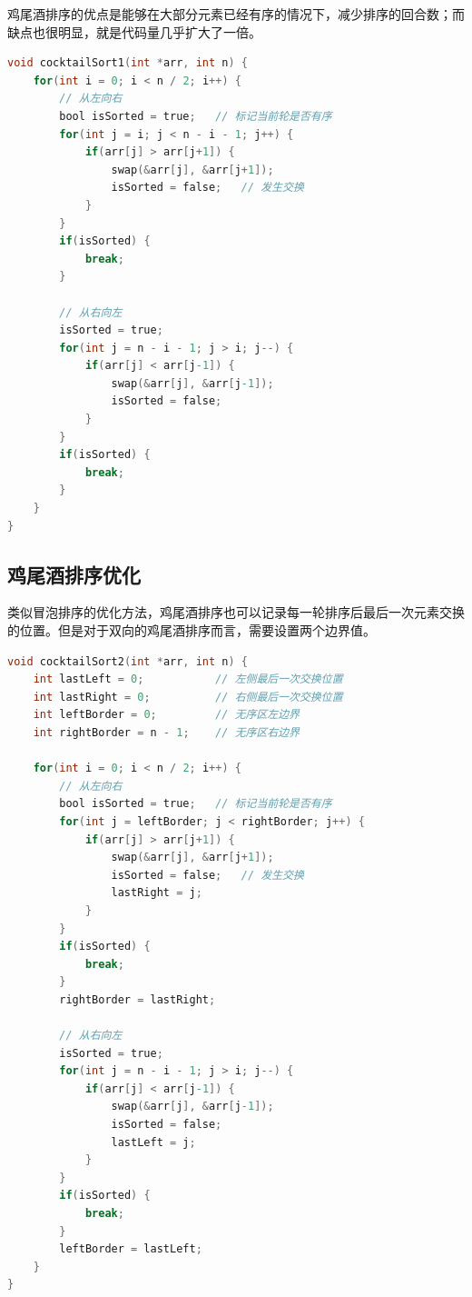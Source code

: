 鸡尾酒排序的优点是能够在大部分元素已经有序的情况下，减少排序的回合数；而缺点也很明显，就是代码量几乎扩大了一倍。 \\


\begin{lstlisting}[language=C]
void cocktailSort1(int *arr, int n) {
    for(int i = 0; i < n / 2; i++) {
        // 从左向右
        bool isSorted = true;   // 标记当前轮是否有序
        for(int j = i; j < n - i - 1; j++) {
            if(arr[j] > arr[j+1]) {
                swap(&arr[j], &arr[j+1]);
                isSorted = false;   // 发生交换
            }
        }
        if(isSorted) {
            break;
        }

        // 从右向左
        isSorted = true;
        for(int j = n - i - 1; j > i; j--) {
            if(arr[j] < arr[j-1]) {
                swap(&arr[j], &arr[j-1]);
                isSorted = false;
            }
        }
        if(isSorted) {
            break;
        }
    }
}
\end{lstlisting}

\subsection{鸡尾酒排序优化}

类似冒泡排序的优化方法，鸡尾酒排序也可以记录每一轮排序后最后一次元素交换的位置。但是对于双向的鸡尾酒排序而言，需要设置两个边界值。 \\


\begin{lstlisting}[language=C]
void cocktailSort2(int *arr, int n) {
    int lastLeft = 0;           // 左侧最后一次交换位置
    int lastRight = 0;          // 右侧最后一次交换位置
    int leftBorder = 0;         // 无序区左边界
    int rightBorder = n - 1;    // 无序区右边界

    for(int i = 0; i < n / 2; i++) {
        // 从左向右
        bool isSorted = true;   // 标记当前轮是否有序
        for(int j = leftBorder; j < rightBorder; j++) {
            if(arr[j] > arr[j+1]) {
                swap(&arr[j], &arr[j+1]);
                isSorted = false;   // 发生交换
                lastRight = j;
            }
        }
        if(isSorted) {
            break;
        }
        rightBorder = lastRight;

        // 从右向左
        isSorted = true;
        for(int j = n - i - 1; j > i; j--) {
            if(arr[j] < arr[j-1]) {
                swap(&arr[j], &arr[j-1]);
                isSorted = false;
                lastLeft = j;
            }
        }
        if(isSorted) {
            break;
        }
        leftBorder = lastLeft;
    }
}
\end{lstlisting}

